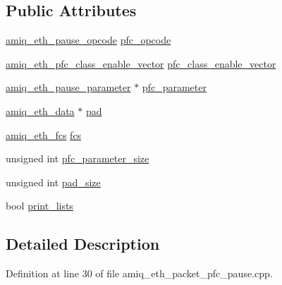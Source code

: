 \subsection*{Public Attributes}
\begin{DoxyCompactItemize}
\item 
\hyperlink{amiq__eth__types_8cpp_a882c4ca2cfd45ca7e4ab471fbaf6f348}{amiq\_\-eth\_\-pause\_\-opcode} \hyperlink{classamiq__eth__packet__pfc__pause_a3248fdfd92b4e26b170f0bd2d0d26229}{pfc\_\-opcode}
\item 
\hyperlink{amiq__eth__types_8cpp_acc82296c2a916d6803e1dd4db06b8a92}{amiq\_\-eth\_\-pfc\_\-class\_\-enable\_\-vector} \hyperlink{classamiq__eth__packet__pfc__pause_a9f34f218b2b2fdb3f9459277a465f220}{pfc\_\-class\_\-enable\_\-vector}
\item 
\hyperlink{amiq__eth__types_8cpp_a9506f5917bf0b1e03bd6946e62cc4a55}{amiq\_\-eth\_\-pause\_\-parameter} $\ast$ \hyperlink{classamiq__eth__packet__pfc__pause_a3cb76fb31642258056bfb06d8844b0cf}{pfc\_\-parameter}
\item 
\hyperlink{amiq__eth__types_8cpp_a3595a0a508d433d383d3e5521fc0b723}{amiq\_\-eth\_\-data} $\ast$ \hyperlink{classamiq__eth__packet__pfc__pause_a70fc4ed398159e0af2d8fc40f0476ed3}{pad}
\item 
\hyperlink{amiq__eth__types_8cpp_adb511dc715b55539c6abdad1de981a9f}{amiq\_\-eth\_\-fcs} \hyperlink{classamiq__eth__packet__pfc__pause_a5cc679d0d63288a1494f7e5bc6316012}{fcs}
\item 
unsigned int \hyperlink{classamiq__eth__packet__pfc__pause_af7531f2b33d11bf9b841357d611bfd8f}{pfc\_\-parameter\_\-size}
\item 
unsigned int \hyperlink{classamiq__eth__packet__pfc__pause_a74ea8b2618525e64c9cad21dc4927f6b}{pad\_\-size}
\item 
bool \hyperlink{classamiq__eth__packet__pfc__pause_a83a474ef0ddf54b1a5d67d4ec155fb37}{print\_\-lists}
\end{DoxyCompactItemize}


\subsection{Detailed Description}


Definition at line 30 of file amiq\_\-eth\_\-packet\_\-pfc\_\-pause.cpp.


